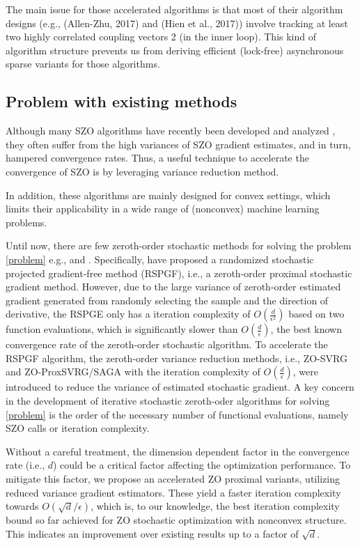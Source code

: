 \documentclass{article}
\theoremstyle{definition}
\theoremstyle{remark}
\begin{document}
{\color{DarkOrchid}
The main issue for those accelerated algorithms is that most of their algorithm designs (e.g., (Allen-Zhu, 2017)
and (Hien et al., 2017)) involve tracking at least two highly
correlated coupling vectors 2 (in the inner loop). This kind
of algorithm structure prevents us from deriving efficient
(lock-free) asynchronous sparse variants for those algorithms.
}
\subsection{Problem with existing methods}
{\color{Brown}
Although many SZO algorithms have recently been developed and analyzed \cite{liu2017zeroth,flaxman2005online,shamir2013complexity,agarwal2010optimal,nesterov2017random,duchi2015optimal,shamir2017optimal,dvurechensky2018accelerated,wang2017stochastic}, they often
suffer from the high variances of SZO gradient estimates, and in turn, hampered convergence rates.
{\color{RubineRed}
Thus, a useful technique to accelerate the convergence of SZO is by leveraging variance reduction method.
}

 In addition, these algorithms are mainly designed for convex settings, which limits their applicability in a wide range of (nonconvex) machine learning problems.
}

{\color{Green}  Until now, there are few zeroth-order stochastic methods
for solving the problem \eqref{problem} e.g., \cite{ghadimi2016accelerated} and \cite{huang2019faster}. Specifically, \cite{ghadimi2016accelerated} have proposed a randomized stochastic projected gradient-free method (RSPGF),
i.e., a zeroth-order proximal stochastic gradient method. However, due to the large variance of zeroth-order estimated gradient generated from randomly selecting the sample and the direction of derivative, the RSPGE only has a iteration complexity of  $O(\frac{d}{\epsilon^2})$ based on two function evaluations, which is significantly slower than $O(\frac{d}{{\epsilon}})$,
the best known convergence rate of the zeroth-order stochastic algorithm. To accelerate the RSPGF algorithm, the zeroth-order variance reduction methods, i.e., ZO-SVRG \cite{liu2018zeroth} and ZO-ProxSVRG/SAGA \cite{huang2019faster} with the iteration
complexity of $O(\frac{d}{{\epsilon}})$, were introduced to reduce the variance of estimated stochastic gradient. 
{\color{RubineRed}
A key concern in the development of iterative stochastic zeroth-oder algorithms for solving  \eqref{problem} is the order of the necessary number of functional evaluations, namely SZO calls or iteration complexity.
}
{\color{Brown}
 Without a
careful treatment, the dimension dependent factor in the convergence rate (i.e., $d$) could be a critical factor affecting
the optimization performance. To mitigate this factor, we propose an accelerated ZO proximal  variants, utilizing reduced variance gradient estimators. These yield a faster iteration complexity towards $O(\sqrt{d}/\epsilon )$, which is, to our knowledge, the best iteration complexity bound so far achieved for ZO stochastic optimization with nonconvex structure.
{\color{RubineRed} This indicates an improvement over existing results up to a factor of ${\sqrt{d}}$.}

}
}
\end{document}
